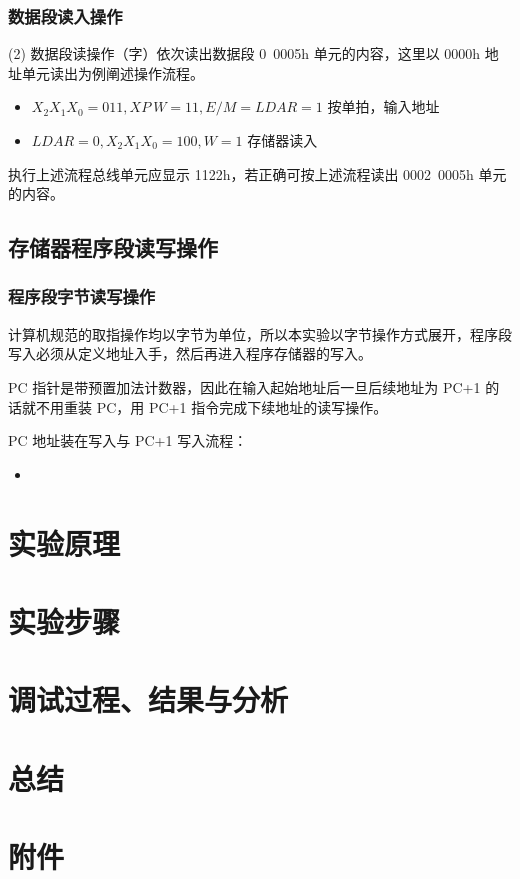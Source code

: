 \documentclass[a4paper,10pt,UTF8]{paper}
\numberwithin{equation}{section}
\numberwithin{figure}{section}
\begin{document}
\subsubsection{数据段读入操作}

(2)	数据段读操作（字）依次读出数据段 0~0005h 单元的内容，这里以 0000h 地址单元读出为例阐述操作流程。

\begin{itemize}
    \item $X_2X_1X_0=011, XP\ W=11,E/M=LDAR=1$ 按单拍，输入地址
    \item $LDAR=0, X_2X_1X_0=100, W=1$ 存储器读入
\end{itemize}

执行上述流程总线单元应显示 1122h，若正确可按上述流程读出 0002~0005h 单元的内容。

\subsection{存储器程序段读写操作}

\subsubsection{程序段字节读写操作}

计算机规范的取指操作均以字节为单位，所以本实验以字节操作方式展开，程序段写入必须从定义地址入手，然后再进入程序存储器的写入。

PC 指针是带预置加法计数器，因此在输入起始地址后一旦后续地址为 PC+1 的话就不用重装 PC，用 PC+1 指令完成下续地址的读写操作。

PC 地址装在写入与 PC+1 写入流程：

\begin{itemize}
    \item 
\end{itemize}

\section{实验原理}

\section{实验步骤}

\section{调试过程、结果与分析}

\section{总结}

\section{附件}
\end{document}
